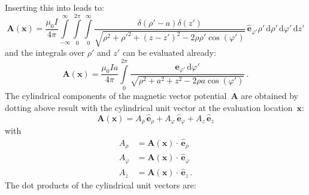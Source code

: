 Inserting this into  leads to:
\begin{equation}
  \mathbf{A}(\mathbf{x}) = \frac{\mu_0 I}{4 \pi} \int\limits_{-\infty}^{\infty} \int\limits_{0}^{2 \pi} \int\limits_{0}^{\infty}
                                                             \frac{\delta(\rho' - a) \delta(z')}{\sqrt{ \rho^2 + \rho'^2 + (z - z')^2 - 2 \rho \rho' \cos(\varphi')}}
                                                             \,\hat{\mathbf{e}}_{\varphi'}
                                                             \rho' \,\mathrm{d} \rho' \,\mathrm{d} \varphi'  \,\mathrm{d} z'
\end{equation}
and the integrals over $\rho'$ and $z'$ can be evaluated already:
\begin{equation}
  \mathbf{A}(\mathbf{x}) = \frac{\mu_0 I a}{4 \pi}
                           \int\limits_{0}^{2 \pi}
                             \frac{\hat{\mathbf{e}}_{\varphi'} \,\mathrm{d} \varphi'}{\sqrt{ \rho^2 + a^2 + z^2 - 2 \rho a \cos(\varphi')}} \, . \label{eqn:vecpot_loop_phiprime}
\end{equation}
The cylindrical components of the magnetic vector potential~$\mathbf{A}$ are obtained
by dotting above result with the cylindrical unit vector at the evaluation location~$\mathbf{x}$:
\begin{equation}
  \mathbf{A}(\mathbf{x}) =   A_\rho    \,\hat{\mathbf{e}}_\rho
                           + A_\varphi \,\hat{\mathbf{e}}_\varphi
                           + A_z       \,\hat{\mathbf{e}}_z
\end{equation}
with
\begin{align}
  A_\rho    &= \mathbf{A}(\mathbf{x}) \cdot \,\hat{\mathbf{e}}_\rho    \\
  A_\varphi &= \mathbf{A}(\mathbf{x}) \cdot \,\hat{\mathbf{e}}_\varphi \\
  A_z       &= \mathbf{A}(\mathbf{x}) \cdot \,\hat{\mathbf{e}}_z       \, .
\end{align}
The dot products of the cylindrical unit vectors are:
